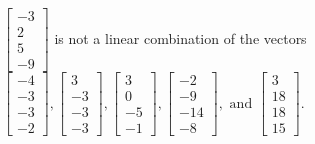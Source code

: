 \begin{exercise}
\begin{exerciseStatement}
  \end{exerciseStatement}
  \begin{exerciseAnswer}
   \(\left[\begin{array}{c}
-3 \\
2 \\
5 \\
-9
\end{array}\right]\) 
  	 is not  
	a linear combination of the vectors \(\left[\begin{array}{c}
-4 \\
-3 \\
-3 \\
-2
\end{array}\right] , \left[\begin{array}{c}
3 \\
-3 \\
-3 \\
-3
\end{array}\right] , \left[\begin{array}{c}
3 \\
0 \\
-5 \\
-1
\end{array}\right] , \left[\begin{array}{c}
-2 \\
-9 \\
-14 \\
-8
\end{array}\right] , \text{ and } \left[\begin{array}{c}
3 \\
18 \\
18 \\
15
\end{array}\right]\).

	
  


  \end{exerciseAnswer}
\end{exercise}